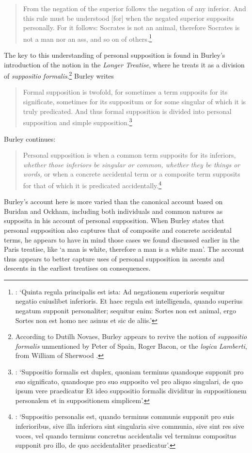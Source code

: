 \documentclass[a4paper, 11pt]{article}
\begin{document}
\begin{quote}
From the negation of the superior follows the negation of any inferior. And this rule must be understood [for] when the negated superior supposits personally. For it follows: Socrates is not an animal, therefore Socrates is not a man nor an ass, and so on of others.\footnote{\autocite[209.35-210.2]{BurleyDPAL}: `Quinta regula principalis est ista: Ad negationem superioris sequitur negatio cuiuslibet inferioris. Et haec regula est intelligenda, quando superius negatum supponit personaliter; sequitur enim: Sortes non est animal, ergo Sortes non est homo nec asinus et sic de aliis.'}
\end{quote} 
The key to this understanding of personal supposition is found in Burley's introduction of the notion in the \emph{Longer Treatise}, where he treats it as a division of \emph{suppositio formalis}.\footnote{According to Dutilh Novaes, Burley appears to revive the notion of \emph{suppositio formalis} unmentioned by Peter of Spain, Roger Bacon, or the \emph{logica Lamberti}, from William of Sherwood \autocite[360]{DutilhNovaes2012c}.} Burley writes
\begin{quote}
Formal supposition is twofold, for sometimes a term supposits for its significate, sometimes for its suppositum or for some singular of which it is truly predicated. And thus formal supposition is divided into personal supposition and simple supposition.\footnote{\autocite[3.1-5]{BurleyDPAL}: `Suppositio formalis est duplex, quoniam terminus quandoque supponit pro suo significato, quandoque pro suo supposito vel pro aliquo singulari, de quo ipsum vere praedicatur Et ideo suppositio formalis dividitur in suppositionem personalem et in suppositionem simplicem'.}
\end{quote}

Burley continues:
\begin{quote}
Personal supposition is when a common term supposits for its inferiors, \emph{whether those inferiors be singular or common, whether they be things or words,} or when a concrete accidental term or a composite term supposits for that of which it is predicated accidentally.\footnote{\autocite[3.19-24]{BurleyDPAL}: `Suppositio personalis est, quando terminus communis supponit pro suis inferioribus, sive illa inferiora sint singularia sive communia, sive sint res sive voces, vel quando terminus concretus accidentalis vel terminus compositus supponit pro illo, de quo accidentaliter praedicatur'.}
\end{quote}
Burley's account here is more varied than the canonical account based on Buridan and Ockham, including both individuals and common natures as supposita in his account of personal supposition. When Burley states that personal supposition also captures that of composite and concrete accidental terms, he appears to have in mind those cases we found discussed earlier in the Paris treatise, like `a man is white, therefore a man is a white man'. The account thus appears to better capture uses of personal supposition in ascents and descents in the earliest treatises on consequences. 
\end{document}
